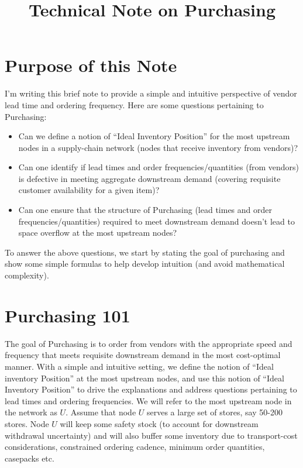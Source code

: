 \documentclass[11pt]{amsart}
\title{Technical Note on Purchasing}
\date{} %
\begin{document}
\maketitle

\section{Purpose of this Note}

I'm writing this brief note to provide a simple and intuitive perspective of vendor lead time and ordering frequency. Here are some questions pertaining to Purchasing:

\begin{itemize}
\item Can we define a notion of ``Ideal Inventory Position'' for the most upstream nodes in a supply-chain network (nodes that receive inventory from vendors)?
\item Can one identify if lead times and order frequencies/quantities (from vendors) is defective in meeting aggregate downstream demand (covering requisite customer availability for a given item)?  
\item Can one ensure that the structure of Purchasing (lead times and order frequencies/quantities) required to meet downstream demand doesn't lead to space overflow at the most upstream nodes?
\end{itemize}

To answer the above questions, we start by stating the goal of purchasing and show some simple formulas to help develop intuition (and avoid mathematical complexity). 

\section{Purchasing 101}

The goal of Purchasing is to order from vendors with the appropriate speed and frequency that meets requisite downstream demand in the most cost-optimal manner. With a simple and intuitive setting, we define the notion of ``Ideal inventory Position'' at the most upstream nodes, and use this notion of ``Ideal Inventory Position'' to drive the explanations and address questions pertaining to lead times and ordering frequencies. We will refer to the most upstream node in the network as $U$. Assume that node $U$ serves a large set of stores, say 50-200 stores. Node $U$ will keep some safety stock (to account for downstream withdrawal uncertainty) and will also buffer some inventory due to transport-cost considerations, constrained ordering cadence, minimum order quantities, casepacks etc.
 
\end{document}
